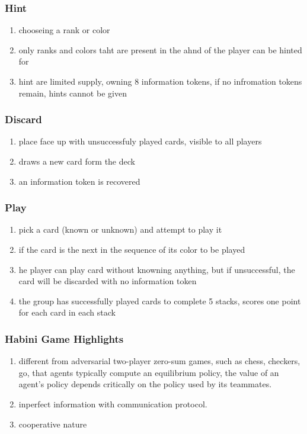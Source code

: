 \documentclass{njupre/njupre}
\begin{document}
\begin{frame}
    \frametitle{Hint}

    \begin{enumerate}
        \item chooseing a rank or color
        \item only ranks and colors taht are present in the ahnd of the player can be hinted for
        \item hint are limited supply, owning 8 information tokens, if no infromation tokens remain, hints cannot be given
    \end{enumerate}
\end{frame}


\begin{frame}
    \frametitle{Discard}

    \begin{enumerate}
        \item place face up with unsuccessfuly played cards, visible to all players
        \item draws a new card form the deck
        \item an information token is recovered
    \end{enumerate}
\end{frame}


\begin{frame}
    \frametitle{Play}

    \begin{enumerate}
        \item pick a card (known or unknown) and attempt to play it
        \item if the card is the next in the sequence of its color to be played
        \item he player can play card without knowning anything, but if unsuccessful, the card will be discarded with no information token
        \item the group has successfully played cards to complete 5 stacks, scores one point for each card in each stack
    \end{enumerate}
\end{frame}

\begin{frame}
    \frametitle{Habini Game Highlights}
    \begin{enumerate}
        \item different from adversarial two-player zero-sum games, such as chess, checkers, go, that agents typically compute an equilibrium policy, the value of an agent's policy depends critically on the policy used by its teammates.
        \item inperfect information with communication protocol.
        \item cooperative nature
    \end{enumerate}

\end{frame}
\end{document}
